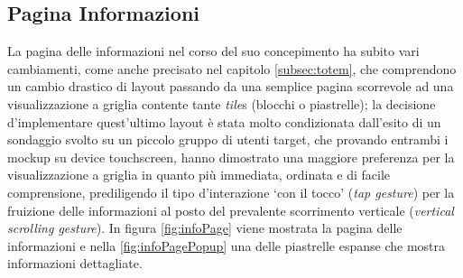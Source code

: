 %
%
\subsection{Pagina Informazioni}
La pagina delle informazioni nel corso del suo concepimento ha subito vari cambiamenti, come anche precisato nel capitolo \ref{subsec:totem}, che comprendono un cambio drastico di layout passando da una semplice pagina scorrevole ad una visualizzazione a griglia contente tante \textit{tile}s (blocchi o piastrelle); la decisione d'implementare quest'ultimo layout è stata molto condizionata dall'esito di un sondaggio svolto su un piccolo gruppo di utenti target, che provando entrambi i mockup su device touchscreen, hanno dimostrato una maggiore preferenza per la visualizzazione a griglia in quanto più immediata, ordinata e di facile comprensione, prediligendo il tipo d'interazione \enquote*{con il tocco} (\textit{tap gesture}) per la fruizione delle informazioni al posto del prevalente scorrimento verticale (\textit{vertical scrolling gesture}). In figura \ref{fig:infoPage} viene mostrata la pagina delle informazioni e nella \ref{fig:infoPagePopup} una delle piastrelle espanse che mostra informazioni dettagliate.

